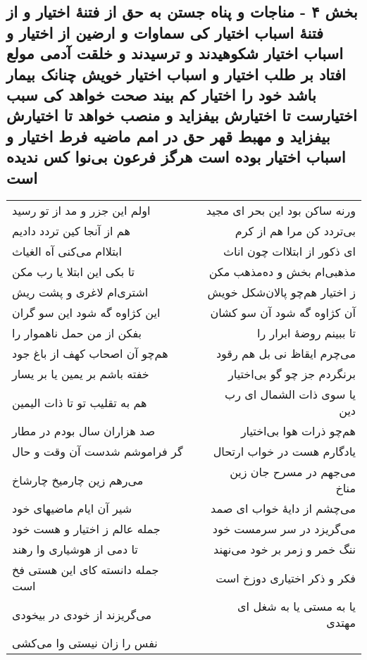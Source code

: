 \begin{center}
\section*{بخش ۴ - مناجات و پناه جستن به حق از فتنهٔ اختیار و از فتنهٔ اسباب اختیار کی سماوات و ارضین از اختیار و اسباب اختیار شکوهیدند و ترسیدند و خلقت آدمی مولع افتاد بر طلب اختیار و اسباب اختیار خویش چنانک بیمار باشد خود را اختیار کم بیند صحت خواهد کی  سبب اختیارست تا اختیارش بیفزاید و منصب خواهد تا اختیارش بیفزاید و  مهبط قهر حق در امم ماضیه فرط اختیار  و اسباب اختیار بوده است هرگز فرعون بی‌نوا کس ندیده است}
\label{sec:sh004}
\begin{longtable}{l p{0.5cm} r}
اولم این جزر و مد از تو رسید
&&
ورنه ساکن بود این بحر ای مجید
\\
هم از آنجا کین تردد دادیم
&&
بی‌تردد کن مرا هم از کرم
\\
ابتلاام می‌کنی آه الغیاث
&&
ای ذکور از ابتلاات چون اناث
\\
تا بکی این ابتلا یا رب مکن
&&
مذهبی‌ام بخش و ده‌مذهب مکن
\\
اشتری‌ام لاغری و پشت ریش
&&
ز اختیار هم‌چو پالان‌شکل خویش
\\
این کژاوه گه شود این سو گران
&&
آن کژاوه گه شود آن سو کشان
\\
بفکن از من حمل ناهموار را
&&
تا ببینم روضهٔ ابرار را
\\
هم‌چو آن اصحاب کهف از باغ جود
&&
می‌چرم ایقاظ نی بل هم رقود
\\
خفته باشم بر یمین یا بر یسار
&&
برنگردم جز چو گو بی‌اختیار
\\
هم به تقلیب تو تا ذات الیمین
&&
یا سوی ذات الشمال ای رب دین
\\
صد هزاران سال بودم در مطار
&&
هم‌چو ذرات هوا بی‌اختیار
\\
گر فراموشم شدست آن وقت و حال
&&
یادگارم هست در خواب ارتحال
\\
می‌رهم زین چارمیخ چارشاخ
&&
می‌جهم در مسرح جان زین مناخ
\\
شیر آن ایام ماضیهای خود
&&
می‌چشم از دایهٔ خواب ای صمد
\\
جمله عالم ز اختیار و هست خود
&&
می‌گریزد در سر سرمست خود
\\
تا دمی از هوشیاری وا رهند
&&
ننگ خمر و زمر بر خود می‌نهند
\\
جمله دانسته کای این هستی فخ است
&&
فکر و ذکر اختیاری دوزخ است
\\
می‌گریزند از خودی در بیخودی
&&
یا به مستی یا به شغل ای مهتدی
\\
نفس را زان نیستی وا می‌کشی

\end{longtable}
\end{center}
